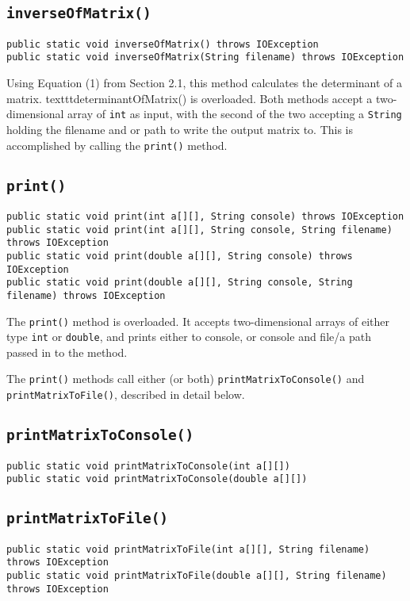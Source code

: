 \documentclass[12pt]{article}
\begin{document}
\subsection{\texttt{inverseOfMatrix()}}
\begin{verbatim}
public static void inverseOfMatrix() throws IOException
public static void inverseOfMatrix(String filename) throws IOException
\end{verbatim}
Using Equation (1) from Section 2.1, this method calculates the determinant of a matrix. texttt{determinantOfMatrix()} is overloaded. Both methods accept a two-dimensional array of \texttt{int} as input, with the second of the two accepting a \texttt{String} holding the filename and or path to write the output matrix to. This is accomplished by calling the \texttt{print()} method.

\subsection{\texttt{print()}}
\begin{verbatim}
public static void print(int a[][], String console) throws IOException
public static void print(int a[][], String console, String filename) throws IOException
public static void print(double a[][], String console) throws IOException
public static void print(double a[][], String console, String filename) throws IOException
\end{verbatim}
The \texttt{print()} method is overloaded. It accepts two-dimensional arrays of either type \texttt{int} or \texttt{double}, and prints either to console, or console and file/a path passed in to the method.
\par The \texttt{print()} methods call either (or both) \texttt{printMatrixToConsole()} and \texttt{printMatrixToFile()}, described in detail below.

\subsection{\texttt{printMatrixToConsole()}}
\begin{verbatim}
public static void printMatrixToConsole(int a[][])
public static void printMatrixToConsole(double a[][])
\end{verbatim}

\subsection{\texttt{printMatrixToFile()}}
\begin{verbatim}
public static void printMatrixToFile(int a[][], String filename) throws IOException
public static void printMatrixToFile(double a[][], String filename) throws IOException
\end{verbatim}
\end{document}
